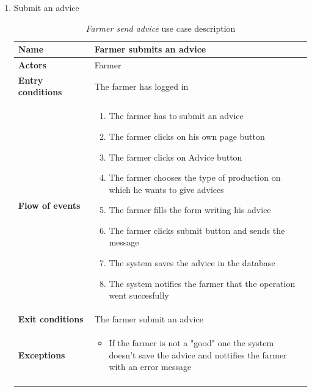 \begin{enumerate}
    \item Submit an advice
    \begin{longtable}{p{0.26\linewidth}p{0.75\linewidth}}
        \toprule
        \textbf{Name} & \textbf{Farmer submits an advice} \\
        \midrule
        \textbf{Actors} & Farmer \\
        \midrule
        \textbf{Entry conditions} & The farmer has logged in\\
        \midrule
        \textbf{Flow of events} & 
        \begin{enumerate}
            \item The farmer has to submit an advice 
            \item The farmer clicks on his own page button
            \item The farmer clicks on Advice button
            \item The farmer chooses the type of production on which he wants to give advices
            \item The farmer fills the form writing his advice
            \item The farmer clicks submit button and sends the message
            \item The system saves the advice in the database
            \item The system notifies the farmer that the operation went succesfully 
        \end{enumerate} \\
        \midrule
        \textbf{Exit conditions} & The farmer submit an advice\\
        \midrule
        \textbf{Exceptions} & 
        \begin{itemize}
            \item If the farmer is not a "good" one the system doesn't save the advice and nottifies the farmer with an error message
        \end{itemize}\\
        \bottomrule
        \caption{\emph{Farmer send advice} use case description}
    \end{longtable}
    \begin{figure}[H]
        \begin{center}

\end{center}
\end{figure}
\end{enumerate}
